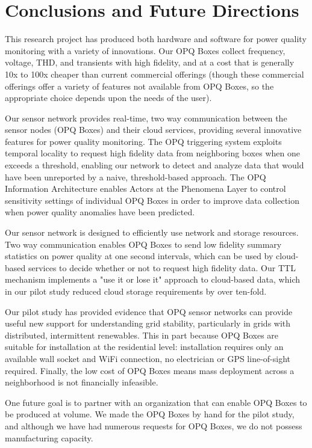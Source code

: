 \section{Conclusions and Future Directions}
\label{sec:conclusions}

This research project has produced both hardware and software for power quality monitoring with a variety of innovations.  Our OPQ Boxes collect frequency, voltage, THD, and transients with high fidelity, and at a cost that is generally 10x to 100x cheaper than current commercial offerings (though these commercial offerings offer a variety of features not available from OPQ Boxes, so the appropriate choice depends upon the needs of the user).

Our sensor network provides real-time, two way communication between the sensor nodes (OPQ Boxes) and their cloud services, providing several innovative features for power quality monitoring. The OPQ triggering system exploits temporal locality to request high fidelity data from neighboring boxes when one exceeds a threshold, enabling our network to detect and analyze data that would have been unreported by a naive, threshold-based approach. The OPQ Information Architecture enables Actors at the Phenomena Layer to control sensitivity settings of individual OPQ Boxes in order to improve data collection when power quality anomalies have been predicted.

Our sensor network is designed to efficiently use network and storage resources. Two way communication enables OPQ Boxes to send low fidelity summary statistics on power quality at one second intervals, which can be used by cloud-based services to decide whether or not to request high fidelity data.  Our TTL mechanism implements a "use it or lose it" approach to cloud-based data, which in our pilot study reduced cloud storage requirements by over ten-fold.

Our pilot study has provided evidence that OPQ sensor networks can provide useful new support for understanding grid stability, particularly in grids with distributed, intermittent renewables. This in part because OPQ Boxes are suitable for installation at the residential level: installation requires only an available wall socket and WiFi connection, no electrician or GPS line-of-sight required. Finally, the low cost of OPQ Boxes means mass deployment across a neighborhood is not financially infeasible.

One future goal is to partner with an organization that can enable OPQ Boxes to be produced at volume. We made the OPQ Boxes by hand for the pilot study, and although we have had numerous requests for OPQ Boxes, we do not possess manufacturing capacity.

